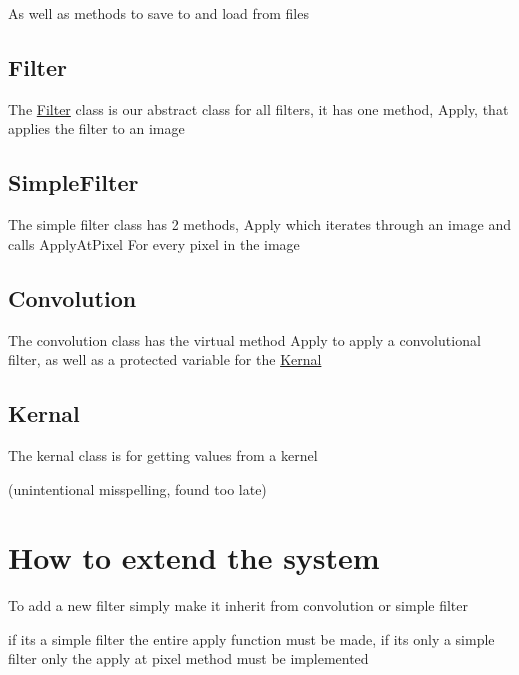 As well as methods to save to and load from files\hypertarget{index_autotoc_md1}{}\subsection{Filter}\label{index_autotoc_md1}
The \hyperlink{classFilter}{Filter} class is our abstract class for all filters, it has one method, Apply, that applies the filter to an image\hypertarget{index_autotoc_md2}{}\subsection{Simple\+Filter}\label{index_autotoc_md2}
The simple filter class has 2 methods, Apply which iterates through an image and calls Apply\+At\+Pixel For every pixel in the image\hypertarget{index_autotoc_md3}{}\subsection{Convolution}\label{index_autotoc_md3}
The convolution class has the virtual method Apply to apply a convolutional filter, as well as a protected variable for the \hyperlink{classKernal}{Kernal}\hypertarget{index_autotoc_md4}{}\subsection{Kernal}\label{index_autotoc_md4}
The kernal class is for getting values from a kernel

(unintentional misspelling, found too late)\hypertarget{index_extending}{}\section{How to extend the system}\label{index_extending}
To add a new filter simply make it inherit from convolution or simple filter

if its a simple filter the entire apply function must be made, if its only a simple filter only the apply at pixel method must be implemented 